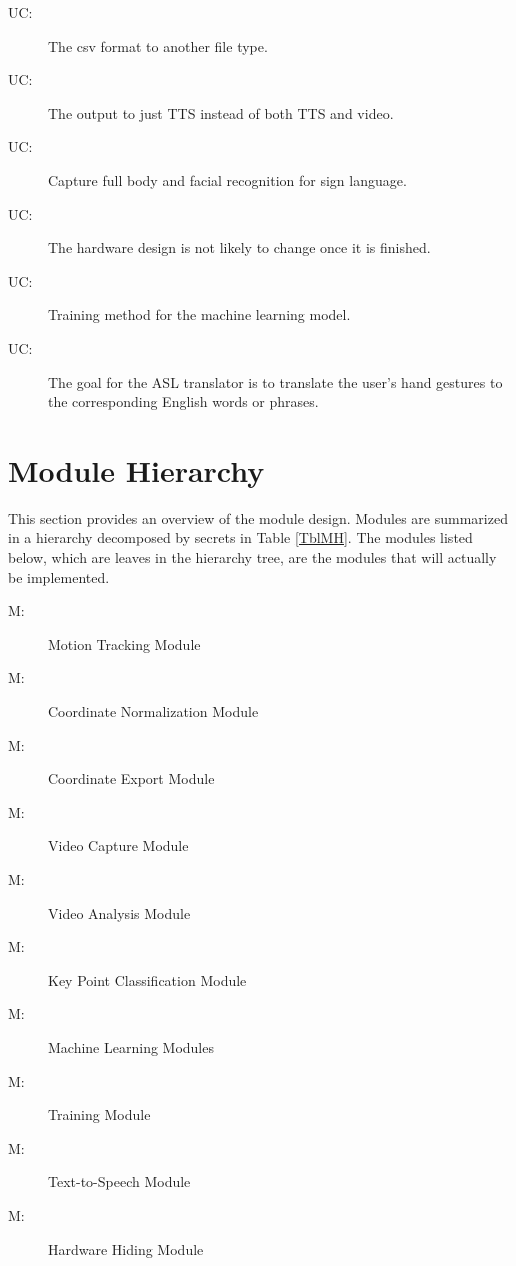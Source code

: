 \documentclass[12pt, titlepage]{article}
\newcounter{ucnum}
\newcommand{\uctheucnum}{UC\theucnum}
\newcounter{mnum}
\newcommand{\mthemnum}{M\themnum}
\begin{document}
\begin{description}
\item[ \uctheucnum \label{uc1}:] The csv format to another file type.
\item[ \uctheucnum \label{uc2}:] The output to just TTS instead of both TTS and video.
\item[ \uctheucnum \label{uc3}:] Capture full body and facial recognition for sign language.
\item[ \uctheucnum \label{uc4}:] The hardware design is not likely to change once it is finished.
\item[ \uctheucnum \label{uc5}:] Training method for the machine learning model.
\item[ \uctheucnum \label{uc6}:] The goal for the ASL translator is to translate the user’s hand gestures to the corresponding English words or phrases.
\end{description}

\section{Module Hierarchy} \label{SecMH}

This section provides an overview of the module design. Modules are summarized
in a hierarchy decomposed by secrets in Table \ref{TblMH}. The modules listed
below, which are leaves in the hierarchy tree, are the modules that will
actually be implemented.

\begin{description}
\item [ \mthemnum \label{m1}:] Motion Tracking Module
\item [ \mthemnum \label{m2}:] Coordinate Normalization Module
\item [ \mthemnum \label{m3}:] Coordinate Export Module
\item [ \mthemnum \label{m4}:] Video Capture Module
\item [ \mthemnum \label{m5}:] Video Analysis Module
\item [ \mthemnum \label{m6}:] Key Point Classification Module
\item [ \mthemnum \label{m7}:] Machine Learning Modules
\item [ \mthemnum \label{m8}:] Training Module
\item [ \mthemnum \label{m9}:] Text-to-Speech Module
\item [ \mthemnum \label{m10}:] Hardware Hiding Module
\end{description}
\end{document}
